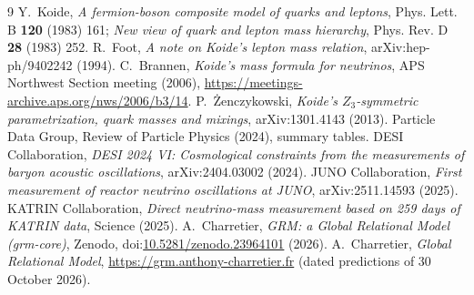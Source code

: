 \documentclass[11pt,a4paper]{article}
\begin{document}
\begin{thebibliography}{9}
 Y.~Koide, \emph{A fermion-boson composite model of quarks and leptons}, Phys. Lett. B \textbf{120}
  (1983) 161; \emph{New view of quark and lepton mass hierarchy}, Phys. Rev. D \textbf{28} (1983) 252.
 R.~Foot, \emph{A note on Koide's lepton mass relation}, arXiv:hep-ph/9402242 (1994).
 C.~Brannen, \emph{Koide's mass formula for neutrinos}, APS Northwest Section meeting (2006),
  \url{https://meetings-archive.aps.org/nws/2006/b3/14}.
 P.~\.Zenczykowski, \emph{Koide's $Z_3$-symmetric parametrization, quark masses and mixings},
  arXiv:1301.4143 (2013).
 Particle Data Group, Review of Particle Physics (2024), summary tables.
 DESI Collaboration, \emph{DESI 2024 VI: Cosmological constraints from the measurements of baryon
  acoustic oscillations}, arXiv:2404.03002 (2024).
 JUNO Collaboration, \emph{First measurement of reactor neutrino oscillations at JUNO},
  arXiv:2511.14593 (2025).
 KATRIN Collaboration, \emph{Direct neutrino-mass measurement based on 259 days of KATRIN data},
  Science (2025).
 A.~Charretier, \emph{GRM: a Global Relational Model (grm-core)}, Zenodo,
  doi:\href{https://doi.org/10.5281/zenodo.23964101}{10.5281/zenodo.23964101} (2026).
 A.~Charretier, \emph{Global Relational Model}, \url{https://grm.anthony-charretier.fr} (dated
  predictions of 30 October 2026).
\end{thebibliography}
\end{document}

